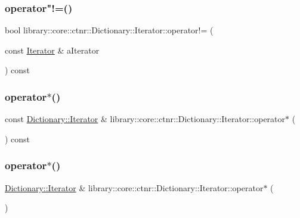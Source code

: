\subsubsection{\texorpdfstring{operator"!=()}{operator!=()}}
{\footnotesize\ttfamily bool library\+::core\+::ctnr\+::\+Dictionary\+::\+Iterator\+::operator!= (\begin{DoxyParamCaption}\item[{const \hyperlink{classlibrary_1_1core_1_1ctnr_1_1_dictionary_1_1_iterator}{Iterator} \&}]{a\+Iterator }\end{DoxyParamCaption}) const}

\mbox{\label{classlibrary_1_1core_1_1ctnr_1_1_dictionary_1_1_iterator_af736a50c1136728f00ea0831495d7d30}} 
\subsubsection{\texorpdfstring{operator$\ast$()}{operator*()}\hspace{0.1cm}{\footnotesize\ttfamily [1/2]}}
{\footnotesize\ttfamily const \hyperlink{classlibrary_1_1core_1_1ctnr_1_1_dictionary_1_1_iterator}{Dictionary\+::\+Iterator} \& library\+::core\+::ctnr\+::\+Dictionary\+::\+Iterator\+::operator$\ast$ (\begin{DoxyParamCaption}{ }\end{DoxyParamCaption}) const}

\mbox{\label{classlibrary_1_1core_1_1ctnr_1_1_dictionary_1_1_iterator_a06fef5eaa31a620a834fb1af367f3929}} 
\subsubsection{\texorpdfstring{operator$\ast$()}{operator*()}\hspace{0.1cm}{\footnotesize\ttfamily [2/2]}}
{\footnotesize\ttfamily \hyperlink{classlibrary_1_1core_1_1ctnr_1_1_dictionary_1_1_iterator}{Dictionary\+::\+Iterator} \& library\+::core\+::ctnr\+::\+Dictionary\+::\+Iterator\+::operator$\ast$ (\begin{DoxyParamCaption}{ }\end{DoxyParamCaption})}


